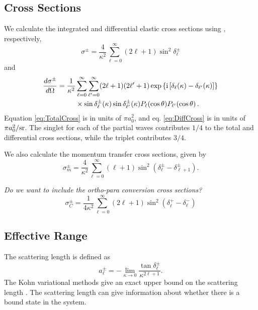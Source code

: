 \documentclass[preprint,showpacs,preprintnumbers,amsmath,amssymb]{revtex4}
\newcommand{\ii}{{\rm{i}}}
\begin{document}
\subsection{Cross Sections}

We calculate the integrated and differential elastic cross sections using \cite{Bransden2003}, respectively,
\begin{equation}
\label{eq:TotalCross}
\sigma^\pm = \frac{4}{\kappa^2} \sum_{\ell=0}^\infty (2\ell+1) \sin^2 \delta_\ell^\pm
\end{equation}
and
\begin{align}
\label{eq:DiffCross}
\nonumber \frac{d\sigma^\pm}{d\Omega} = \frac{1}{\kappa^2} & \sum_{\ell=0}^\infty \sum_{\ell^\prime=0}^\infty (2\ell+1)(2\ell^\prime+1) \exp\left\{\ii \left[\delta_\ell(\kappa) - \delta_{\ell^\prime}(\kappa) \right] \right\} \\
& \times \sin\delta_\ell^\pm(\kappa) \sin\delta_{\ell^\prime}^\pm(\kappa) P_\ell(\cos\theta) P_{\ell^\prime}(\cos\theta)\,.
\end{align}
Equation \ref{eq:TotalCross} is in units of $\pi a_0^2$, and eq. \ref{eq:DiffCross} is in units of $\pi a_0^2 / \rm{sr}$. The singlet for each of the partial waves contributes $1/4$ to the total and differential cross sections, while the triplet contributes $3/4$.

We also calculate the momentum transfer cross sections, given by \cite{}
\begin{equation}
\label{eq:MomentumCross}
\sigma_{m}^\pm = \frac{4}{\kappa^2} \sum_{\ell=0}^\infty (\ell+1) \sin^2 (\delta_\ell^\pm - \delta_{\ell+1}^\pm) .
\end{equation}

\emph{Do we want to include the ortho-para conversion cross sections? \cite{}}
\begin{equation}
\label{eq:OrthoParaCross}
\sigma_{C}^\pm = \frac{1}{4 \kappa^2} \sum_{\ell=0}^\infty (2 \ell+1) \sin^2 (\delta_\ell^+ - \delta_\ell^-)
\end{equation}


\subsection{Effective Range}

The scattering length is defined as \citep[pg. 589]{Bransden2003}
\begin{equation}
\label{eq:ScatLen}
a_\ell^\pm = -\lim_{\kappa \to 0} \frac{\tan{\delta_\ell^\pm}}{\kappa^{2\ell+1}}.
\end{equation}
The Kohn variational methods give an exact upper bound on the scattering length \cite{?}. The scattering length can give information about whether there is a bound state in the system. 
\end{document}
